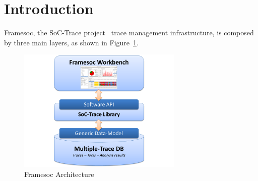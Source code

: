 \documentclass[twoside]{article}
\begin{document}
\begin{sloppypar} %

\shorthandoff{:} %

\newcommand{\parag}[1]{\paragraph{#1}\mbox{}\\}
\newcommand{\subparag}[1]{\subparagraph{#1}\mbox{}\\}
\newcommand{\subsubparag}[1]{\subparagraph{#1}}
\newcommand{\num}[1]{\textcolor{red}{#1}}

\renewcommand{\labelitemi}{$\bullet$}
\renewcommand{\labelitemii}{$\circ$}

\makeRT 

\renewcommand{\contentsname}{Table of contents}
\tableofcontents
\newpage
\section{Introduction}
\label{sec:introduction}


Framesoc, the SoC-Trace project~\cite{SoC-TRACE} trace management infrastructure, is composed by three main layers, as shown in Figure~\ref{fig:architecture}.

\begin{figure}[h]
  \centering
    \includegraphics[width=0.7\textwidth]{images/framesoc_architecture.pdf}
  \caption{Framesoc Architecture}
  \label{fig:architecture}
\end{figure}


\end{sloppypar}
\end{document}
